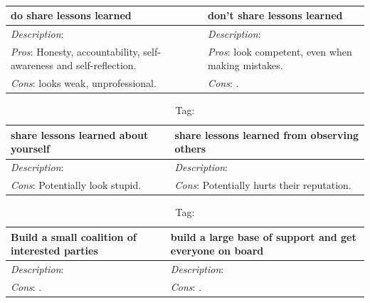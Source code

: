 \begin{center}
\begin{table}[ht]
\begin{tabular}{ | m{\dilemmatablewidth}| m{\dilemmatablewidth} | } 
  \hline
  \textbf{do share lessons learned} & 
  \textbf{don't share lessons learned} \\ 
  \hline
  \textit{Description}:  & 
  \textit{Description}:  \\ 
  \hline
  \textit{Pros}: Honesty, accountability, self-awareness and self-reflection. & 
  \textit{Pros}: look competent, even when making mistakes. \\  
  \hline
  \textit{Cons}: looks weak, unprofessional. & 
  \textit{Cons}: . \\  
  \hline
\end{tabular}
\caption{
}
\label{table:sharing_lessons_learned}
\end{table}
\end{center}

\begin{center}
\begin{table}[ht]
\begin{tabular}{ | m{\dilemmatablewidth}| m{\dilemmatablewidth} | } 
  \hline
  \textbf{share lessons learned about yourself} & 
  \textbf{share lessons learned from observing others  } \\ 
  \hline
  \textit{Description}:  & 
  \textit{Description}:  \\ 
  \hline
  \textit{Cons}: Potentially look stupid. & 
  \textit{Cons}: Potentially hurts their reputation. \\  
  \hline
\end{tabular}
\caption{
{\tiny Tag: }
}
\label{table:share_lessons_learned}
\end{table}
\end{center}


\begin{center}
\begin{table}[ht]
\begin{tabular}{ | m{\dilemmatablewidth}| m{\dilemmatablewidth} | } 
  \hline
  \textbf{Build a small coalition of interested parties} & 
  \textbf{build a large base of support and get everyone on board} \\ 
  \hline
  \textit{Description}:  & 
  \textit{Description}:  \\ 
  \hline
  \textit{Cons}: . & 
  \textit{Cons}: . \\  
  \hline
\end{tabular}
\caption{
{\tiny Tag: }
}
\label{table:how_to_change}
\end{table}
\end{center}

